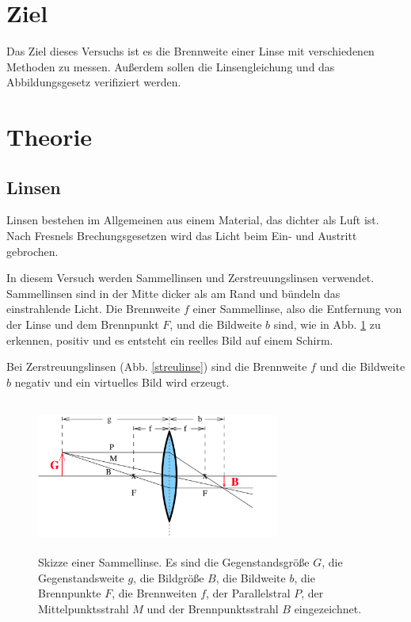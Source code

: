 \section{Ziel}
Das Ziel dieses Versuchs ist es die Brennweite einer Linse mit verschiedenen Methoden zu messen. Außerdem sollen die Linsengleichung und das Abbildungsgesetz verifiziert werden.

\section{Theorie}
\label{sec:Theorie}

\subsection{Linsen}
Linsen bestehen im Allgemeinen aus einem Material, das dichter als Luft ist.
Nach Fresnels Brechungsgesetzen wird das Licht beim Ein- und Austritt gebrochen.

\noindent In diesem Versuch werden Sammellinsen und Zerstreuungslinsen verwendet. Sammellinsen sind in der Mitte dicker als am Rand und bündeln das einstrahlende Licht. Die Brennweite $f$ einer Sammellinse, also die Entfernung von der Linse und dem Brennpunkt $F$, und die Bildweite $b$ sind, wie in Abb. \ref{sammellinse} zu erkennen, positiv und es entsteht ein reelles Bild auf einem Schirm.

\noindent Bei Zerstreuungslinsen (Abb. \ref{streulinse}) sind die Brennweite $f$ und die Bildweite $b$ negativ und ein virtuelles Bild wird erzeugt.

\begin{figure}
    \centering
    \includegraphics[width=8cm, height=5cm]{build/sammellinse.png}
    \caption{Skizze einer Sammellinse. Es sind die Gegenstandsgröße $G$, die Gegenstandsweite $g$, die Bildgröße $B$, die Bildweite $b$, die Brennpunkte $F$, die Brennweiten $f$, der Parallelstral $P$, der Mittelpunktsstrahl $M$ und der Brennpunktsstrahl $B$ eingezeichnet. \cite{V408}}
    \label{sammellinse}
\end{figure}

